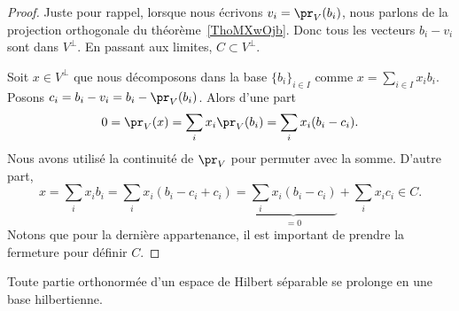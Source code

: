 \begin{proof}
	Juste pour rappel, lorsque nous écrivons \( v_i=\pr_V(b_i)\), nous parlons de la projection orthogonale du théorème~\ref{ThoMXwOjb}. Donc tous les vecteurs \( b_i-v_i\) sont dans \( V^{\perp}\). En passant aux limites, \( C\subset V^{\perp}\).

	Soit \( x\in V^{\perp}\) que nous décomposons dans la base \( \{ b_i \}_{i\in I}\) comme \( x=\sum_{i\in I}x_ib_i\). Posons \( c_i=b_i-v_i=b_i-\pr_V(b_i)\). Alors d'une part
	\begin{equation}
		0=\pr_V(x)=\sum_ix_i\pr_V(b_i)=\sum_ix_i(b_i-c_i).
	\end{equation}
	Nous avons utilisé la continuité de \( \pr_V\) pour permuter avec la somme. D'autre part,
	\begin{equation}
		x=\sum_ix_ib_i=\sum_ix_i(b_i-c_i+c_i)=\underbrace{\sum_ix_i(b_i-c_i)}_{=0}+\sum_ix_ic_i\in C.
	\end{equation}
	Notons que pour la dernière appartenance, il est important de prendre la fermeture pour définir \( C\).
\end{proof}

\begin{proposition}
	Toute partie orthonormée d'un espace de Hilbert séparable se prolonge en une base hilbertienne.
\end{proposition}

